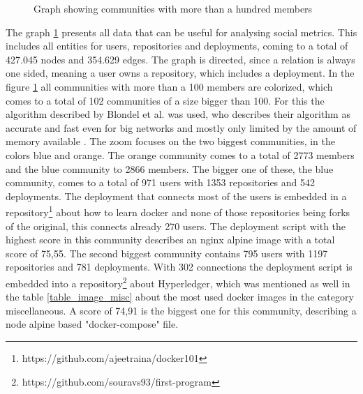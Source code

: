 \begin{figure}[H]\centering
{}
    \caption{Graph showing communities with more than a hundred members}
    \label{fig:graph_communities}
\end{figure}

The graph \ref{fig:graph_communities} presents all data that can be useful for analysing social metrics. This includes all entities for users, repositories and deployments, coming to a total of 427.045 nodes and 354.629 edges. The graph is directed, since a relation is always one sided, meaning a user owns a repository, which includes a deployment. In the figure \ref{fig:graph_communities} all communities with more than a 100 members are colorized, which comes to a total of 102 communities of a size bigger than 100. For this the algorithm described by Blondel et al. was used, who describes their algorithm as accurate and fast even for big networks and mostly only limited by the amount of memory available \cite{Blondel_2008}. The zoom focuses on the two biggest communities, in the colors blue and orange. The orange community comes to a total of 2773 members and the blue community to 2866 members. The bigger one of these, the blue community, comes to a total of 971 users with 1353 repositories and 542 deployments. The deployment that connects most of the users is embedded in a repository\footnote{https://github.com/ajeetraina/docker101} about how to learn docker and none of those repositories being forks of the original, this connects already 270 users. The deployment script with the highest score in this community describes an nginx alpine image with a total score of 75,55.
The second biggest community contains 795 users with 1197 repositories and 781 deployments. With 302 connections the deployment script is embedded into a repository\footnote{https://github.com/souravs93/first-program} about Hyperledger, which was mentioned as well in the table \ref{table_image_misc} about the most used docker images in the category miscellaneous. A score of 74,91 is the biggest one for this community, describing a node alpine based "docker-compose" file.

